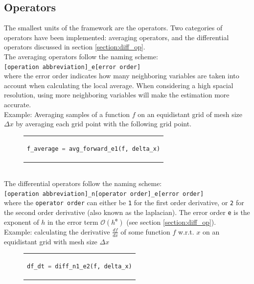 \subsection{Operators}
The smallest units of the framework are the operators.
Two categories of operators have been implemented: averaging operators, and the differential operators discussed in section \ref{section:diff_op}.\\
The averaging operators follow the naming scheme:
\\
\texttt{[operation abbreviation]\_e[error order]}
\\
where the error order indicates how many neighboring variables are taken into account when calculating the local average.
When considering a high spacial resolution, using more neighboring variables will make the estimation more accurate.\\
Example: Averaging samples of a function $f$ on an equidistant grid of mesh size $\Delta x$ by averaging each grid point with the following grid point.
\begin{figure}[htpb]
  \centering
  \begin{tabular}{c}
  \begin{lstlisting}[language=Python]
    f_average = avg_forward_e1(f, delta_x)
  \end{lstlisting}
  \end{tabular}
\end{figure}
\\
The differential operators follow the naming scheme:
\\
\texttt{[operation abbreviation]\_n[operator order]\_e[error order]}
\\ 
where the \texttt{operator order} can either be \texttt{1} for the first order derivative, or \texttt{2} for the second order derivative (also known as the laplacian).
The error order \texttt{e} is the exponent of $h$ in the error term $\mathcal{O}(h^\texttt{e})$ (see section \ref{section:diff_op}).\\
Example: calculating the derivative $\frac{df}{dx}$ of some function $f$ w.r.t. $x$ on an equidistant grid with mesh size $\Delta x$
\begin{figure}[htpb]
  \centering
  \begin{tabular}{c}
  \begin{lstlisting}[language=Python]
    df_dt = diff_n1_e2(f, delta_x)
  \end{lstlisting}
  \end{tabular}
\end{figure}

